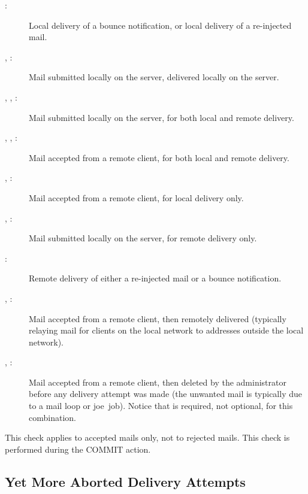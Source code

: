 \begin{description}

    \item [:] Local delivery of a bounce notification, or
        local delivery of a re-injected mail.

    \item [, :] Mail submitted locally on the
        server, delivered locally on the server.

    \item [, , :] Mail submitted
        locally \newline{} on the server, for both local and remote
        delivery.

    \item [, , :] Mail accepted
        from a remote client, for both local and remote delivery.

    \item [, :] Mail accepted from a remote
        client, for local delivery only.

    \item [, :] Mail submitted locally on the
        server, for remote delivery only.

    \item [:] Remote delivery of either a re-injected mail or
        a bounce notification.

    \item [, :] Mail accepted from a remote
        client, then remotely delivered (typically relaying mail for
        clients on the local network to addresses outside the local
        network).

    \item [, :] Mail accepted from a remote
        client, then deleted by the administrator before any delivery
        attempt was made (the unwanted mail is typically due to a mail loop
        or joe~job).  Notice that  is
        required, not optional, for this combination.

\end{description}

This check applies to accepted mails only, not to rejected mails.  This
check is performed during the COMMIT action.

\subsection{Yet More Aborted Delivery Attempts}

